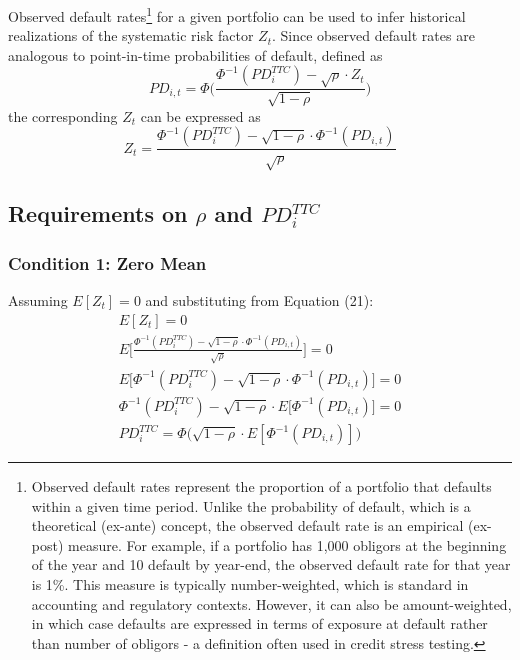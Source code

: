 \documentclass[11pt,a4paper]{article}
\begin{document}
Observed default rates\footnote{Observed default rates represent the proportion of a portfolio that defaults within a given time period. Unlike the probability of default, which is a theoretical (ex-ante) concept, the observed default rate is an empirical (ex-post) measure. For example, if a portfolio has 1,000 obligors at the beginning of the year and 10 default by year-end, the observed default rate for that year is 1\%. This measure is typically number-weighted, which is standard in accounting and regulatory contexts. However, it can also be amount-weighted, in which case defaults are expressed in terms of exposure at default rather than number of obligors - a definition often used in credit stress testing.} for a given portfolio can be used to infer historical realizations of the systematic risk factor $Z_t$. Since observed default rates are analogous to point-in-time probabilities of default, defined as
\begin{equation}
PD_{i, t} = \Phi \Bigg(\frac{\Phi^{-1}(PD_i^{TTC}) - \sqrt{\rho} \cdot Z_t}{\sqrt{1 - \rho}} \Bigg)
\end{equation}
the corresponding $Z_t$ can be expressed as
\begin{equation}
Z_t = \frac{\Phi^{-1}(PD_i^{TTC}) - \sqrt{1 - \rho} \cdot \Phi^{-1}(PD_{i, t})}{\sqrt{\rho}}
\end{equation}

\subsection{Requirements on $\rho$ and $PD_i^{TTC}$}

\subsubsection{Condition 1: Zero Mean}
Assuming $E[Z_t] = 0$ and substituting from Equation (21):
\begin{equation}
\begin{aligned}
E[Z_t] = 0 \\
E\Bigg[\frac{\Phi^{-1}(PD_i^{TTC}) - \sqrt{1 - \rho} \cdot \Phi^{-1}(PD_{i, t})}{\sqrt{\rho}} \Bigg] = 0 \\
E\Big[\Phi^{-1}(PD_i^{TTC}) - \sqrt{1 - \rho} \cdot \Phi^{-1}(PD_{i, t}) \Big] = 0 \\
\Phi^{-1}(PD_i^{TTC}) - \sqrt{1 - \rho} \cdot E \Big[\Phi^{-1}(PD_{i, t}) \Big] = 0 \\
PD_i^{TTC} = \Phi \Big( \sqrt{1 - \rho} \cdot E [\Phi^{-1}(PD_{i, t})] \Big)
\end{aligned}
\end{equation}
\end{document}
